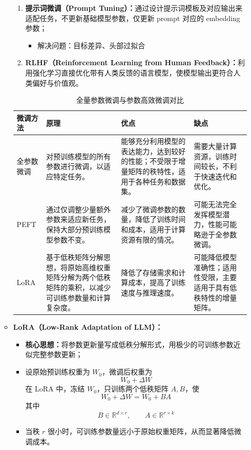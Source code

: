 \documentclass[../main.tex]{subfiles}
\begin{document}
\begin{enumerate}
\begin{itemize}
\begin{enumerate}
            \item \textbf{提示词微调（Prompt Tuning）：}通过设计提示词模板及对应输出来适配任务，不更新基础模型参数，仅更新 prompt 对应的 embedding 参数；
            \begin{itemize}
                \item 解决问题：目标差异、头部过拟合
            \end{itemize}
            
            \item \textbf{RLHF（Reinforcement Learning from Human Feedback）：}利用强化学习直接优化带有人类反馈的语言模型，使模型输出更符合人类偏好与价值观。
        \end{enumerate}
        \begin{table}[H]
            \centering
            \caption{全量参数微调与参数高效微调对比}
            \begin{tabular}{p{2.2cm}p{4.6cm}p{4.3cm}p{4.3cm}}
                \toprule
                微调方法 & 原理 & 优点 & 缺点 \\
                \midrule
                全参数微调 & 对预训练模型的所有参数进行微调，以适应特定任务。 & 能够充分利用模型的表达能力，达到较好的性能；不受限于增量矩阵的秩特性，适用于各种任务和数据集。 & 需要大量计算资源，训练时间较长，不利于快速迭代和优化。 \\
                
                PEFT & 通过仅调整少量额外参数来适应新任务，保持大部分预训练模型参数不变。 & 减少了微调参数的数量，降低了训练时间和成本，适用于计算资源有限的情况。 & 可能无法完全发挥模型潜力，性能可能略逊于全参数微调。 \\
                
                LoRA & 基于低秩矩阵分解思想，将原始高维权重矩阵分解为两个低秩矩阵的乘积，以减少可训练参数量和计算复杂度。 & 降低了存储需求和计算成本，提高了训练速度与推理速度。 & 可能降低模型准确性；适用性受限，主要适用于具有低秩特性的增量矩阵。 \\
                \bottomrule
            \end{tabular}
        \end{table}
        \item \textbf{LoRA（Low-Rank Adaptation of LLM）：}
        \begin{itemize}
            \item \textbf{核心思想：}将参数更新量写成低秩分解形式，用极少的可训练参数近似完整参数更新；
            \item 设原始预训练权重为 $W_0$，微调后权重为
            $$
            W_0+\Delta W
            $$
            在 LoRA 中，冻结 $W_0$，只训练两个低秩矩阵 $A,B$，使
            $$
            W_0+\Delta W = W_0+BA
            $$
            其中
            $$
            B\in \mathbb{R}^{d\times r},\qquad A\in \mathbb{R}^{r\times k}
            $$
            \item 当秩 $r$ 很小时，可训练参数量远小于原始权重矩阵，从而显著降低微调成本。
        \end{itemize}
        

\end{itemize}
\end{enumerate}
\end{document}
